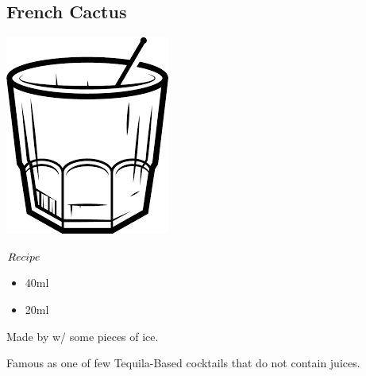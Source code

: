\subsection{French Cactus}
\vspace{-7mm}
\hspace{42mm}
\includegraphics[scale=.06]{cocktail_glass_rock.png}
\vspace{2.5mm}
\begin{itembox}[l]{\boldmath $Recipe$}
\begin{itemize}
\setlength{\parskip}{0cm}
\setlength{\itemsep}{0cm}
\item \teq 40ml
\item \cointreau 20ml
\end{itemize}
\vspace{-4mm}
Made by \build w/ some pieces of ice.
\end{itembox}
Famous as one of few Tequila-Based cocktails that do not contain juices.
